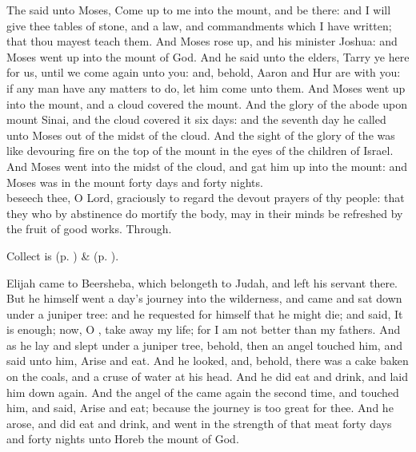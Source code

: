  The  said unto Moses, Come up to me into the mount, and be there: and I will give thee tables of stone, and a law, and commandments which I have written; that thou mayest teach them. And Moses rose up, and his minister Joshua: and Moses went up into the mount of God. And he said unto the elders, Tarry ye here for us, until we come again unto you: and, behold, Aaron and Hur are with you: if any man have any matters to do, let him come unto them. And Moses went up into the mount, and a cloud covered the mount. And the glory of the  abode upon mount Sinai, and the cloud covered it six days: and the seventh day he called unto Moses out of the midst of the cloud. And the sight of the glory of the  was like devouring fire on the top of the mount in the eyes of the children of Israel. And Moses went into the midst of the cloud, and gat him up into the mount: and Moses was in the mount forty days and forty nights.
\\
{} beseech thee, O Lord, graciously to regard the devout prayers of thy people: that they who by abstinence do mortify the body, may in their minds be refreshed by the fruit of good works. Through.
\begin{rubric}
     Collect is  (p. \pageref{SPSaints}) \&   (p. \pageref{SPLivingDeparted}).
\end{rubric}

 Elijah came to Beersheba, which belongeth to Judah, and left his servant there. But he himself went a day's journey into the wilderness, and came and sat down under a juniper tree: and he requested for himself that he might die; and said, It is enough; now, O , take away my life; for I am not better than my fathers. And as he lay and slept under a juniper tree, behold, then an angel touched him, and said unto him, Arise and eat. And he looked, and, behold, there was a cake baken on the coals, and a cruse of water at his head. And he did eat and drink, and laid him down again. And the angel of the  came again the second time, and touched him, and said, Arise and eat; because the journey is too great for thee. And he arose, and did eat and drink, and went in the strength of that meat forty days and forty nights unto Horeb the mount of God.

